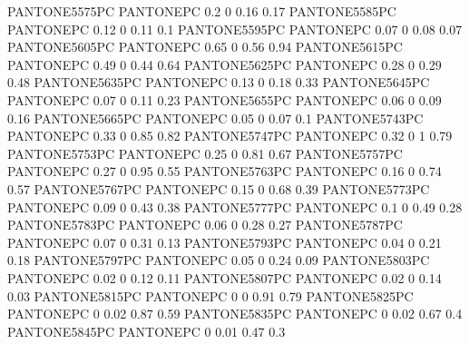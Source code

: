  {PANTONE5575PC} {PANTONE\SpotSpace PC} {0.2 0 0.16 0.17}
 {PANTONE5585PC} {PANTONE\SpotSpace PC} {0.12 0 0.11 0.1}
 {PANTONE5595PC} {PANTONE\SpotSpace PC} {0.07 0 0.08 0.07}
 {PANTONE5605PC} {PANTONE\SpotSpace PC} {0.65 0 0.56 0.94}
 {PANTONE5615PC} {PANTONE\SpotSpace PC} {0.49 0 0.44 0.64}
 {PANTONE5625PC} {PANTONE\SpotSpace PC} {0.28 0 0.29 0.48}
 {PANTONE5635PC} {PANTONE\SpotSpace PC} {0.13 0 0.18 0.33}
 {PANTONE5645PC} {PANTONE\SpotSpace PC} {0.07 0 0.11 0.23}
 {PANTONE5655PC} {PANTONE\SpotSpace PC} {0.06 0 0.09 0.16}
 {PANTONE5665PC} {PANTONE\SpotSpace PC} {0.05 0 0.07 0.1}
 {PANTONE5743PC} {PANTONE\SpotSpace PC} {0.33 0 0.85 0.82}
 {PANTONE5747PC} {PANTONE\SpotSpace PC} {0.32 0 1 0.79}
 {PANTONE5753PC} {PANTONE\SpotSpace PC} {0.25 0 0.81 0.67}
 {PANTONE5757PC} {PANTONE\SpotSpace PC} {0.27 0 0.95 0.55}
 {PANTONE5763PC} {PANTONE\SpotSpace PC} {0.16 0 0.74 0.57}
 {PANTONE5767PC} {PANTONE\SpotSpace PC} {0.15 0 0.68 0.39}
 {PANTONE5773PC} {PANTONE\SpotSpace PC} {0.09 0 0.43 0.38}
 {PANTONE5777PC} {PANTONE\SpotSpace PC} {0.1 0 0.49 0.28}
 {PANTONE5783PC} {PANTONE\SpotSpace PC} {0.06 0 0.28 0.27}
 {PANTONE5787PC} {PANTONE\SpotSpace PC} {0.07 0 0.31 0.13}
 {PANTONE5793PC} {PANTONE\SpotSpace PC} {0.04 0 0.21 0.18}
 {PANTONE5797PC} {PANTONE\SpotSpace PC} {0.05 0 0.24 0.09}
 {PANTONE5803PC} {PANTONE\SpotSpace PC} {0.02 0 0.12 0.11}
 {PANTONE5807PC} {PANTONE\SpotSpace PC} {0.02 0 0.14 0.03}
 {PANTONE5815PC} {PANTONE\SpotSpace PC} {0 0 0.91 0.79}
 {PANTONE5825PC} {PANTONE\SpotSpace PC} {0 0.02 0.87 0.59}
 {PANTONE5835PC} {PANTONE\SpotSpace PC} {0 0.02 0.67 0.4}
 {PANTONE5845PC} {PANTONE\SpotSpace PC} {0 0.01 0.47 0.3}
